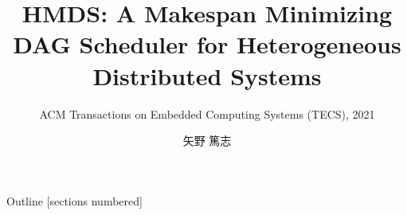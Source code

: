 \newcommand{\beamerDir}[0]{/mnt/c/Users/atsushi/Documents/workspace/env/Beamer/beamer/beamer/}





\newcommand{\forme}[1]{}


\title{HMDS: A Makespan Minimizing DAG Scheduler for Heterogeneous Distributed Systems}
\subtitle{ACM Transactions on Embedded Computing Systems (TECS), 2021}
\author{矢野 篤志}




\maketitle



\begin{frame}{Outline}
    [sections numbered]
    \scriptsize\tableofcontents[hideallsubsections]
\end{frame}








\lastpage

%     
%     



